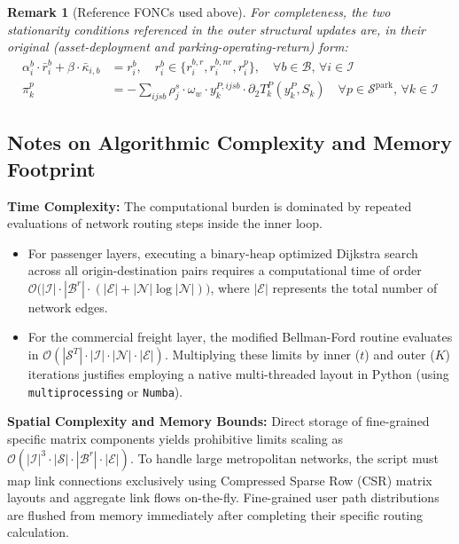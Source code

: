 \documentclass[11pt,a4paper]{article}
\newtheorem{remark}{Remark}
\begin{document}
\begin{remark}[Reference FONCs used above]
For completeness, the two stationarity conditions referenced in the outer structural updates are, in their original (asset-deployment and parking-operating-return) form:
\begin{align}
    \alpha^b_i \cdot \bar{r}^b_i + \beta \cdot \bar{\kappa}_{i,b} &= r^b_i, \quad r^b_i \in \{r_i^{b,r}, r_i^{b,nr}, r_i^p\}, \quad \forall b \in \mathcal{B},\,\forall i \in \mathcal{I} \label{eq:fonc_asset_building} \\
    \pi^p_k &= -\sum_{ijsb} \rho^s_j \cdot \omega_w \cdot y^{P,ijsb}_k \cdot \partial_2 T^P_k(y_k^P, S_k) \quad \forall p \in \mathcal{S}^{\mathrm{park}},\,\forall k \in \mathcal{I} \label{eq:fonc_parking_hours_value}
\end{align}
\end{remark}

\subsection{Notes on Algorithmic Complexity and Memory Footprint}

\textbf{Time Complexity:}
The computational burden is dominated by repeated evaluations of network routing steps inside the inner loop.
\begin{itemize}
    \item For passenger layers, executing a binary-heap optimized Dijkstra search across all origin-destination pairs requires a computational time of order $\mathcal{O}\bigl( |\mathcal{I}| \cdot |\mathcal{B}^r| \cdot (|\mathcal{E}| + |\mathcal{N}|\log|\mathcal{N}|) \bigr)$, where $|\mathcal{E}|$ represents the total number of network edges.
    \item For the commercial freight layer, the modified Bellman-Ford routine evaluates in $\mathcal{O}(|\mathcal{S}^T| \cdot |\mathcal{I}| \cdot |\mathcal{N}| \cdot |\mathcal{E}|)$. Multiplying these limits by inner ($t$) and outer ($K$) iterations justifies employing a native multi-threaded layout in Python (using \texttt{multiprocessing} or \texttt{Numba}).
\end{itemize}

\noindent\textbf{Spatial Complexity and Memory Bounds:}
Direct storage of fine-grained specific matrix components yields prohibitive limits scaling as $\mathcal{O}(|\mathcal{I}|^3 \cdot |\mathcal{S}| \cdot |\mathcal{B}^r| \cdot |\mathcal{E}|)$. To handle large metropolitan networks, the script must map link connections exclusively using Compressed Sparse Row (CSR) matrix layouts and aggregate link flows on-the-fly. Fine-grained user path distributions are flushed from memory immediately after completing their specific routing calculation.
\end{document}
